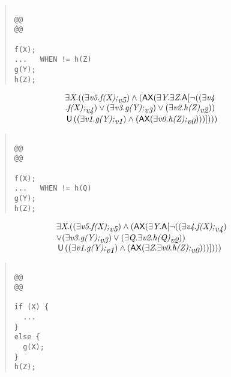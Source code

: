 \documentclass{article}
\newcommand{\U}{\,\mbox{\sf{U}}\,}
\newcommand{\A}{\mbox{\sf{A}}}
\newcommand{\AX}{\mbox{\sf{AX}}}
\newcommand{\mita}[1]{\mbox{\it{{#1}}}}
\begin{document}
\begin{quote}\begin{verbatim}

@@
@@

f(X);
...   WHEN != h(Z)
g(Y);
h(Z);
\end{verbatim}\end{quote}

\[\begin{array}{l}
\exists \mita{X} . ((\exists \mita{v5} . \mita{f(X);}_{\mita{v5}}) \wedge (\AX(\exists \mita{Y} . \exists \mita{Z} . \A[\neg ((\exists \mita{v4}\\ . \mita{f(X);}_{\mita{v4}}) \vee (\exists \mita{v3} . \mita{g(Y);}_{\mita{v3}}) \vee (\exists \mita{v2} . \mita{h(Z)}_{\mita{v2}}))\\ \U ((\exists \mita{v1} . \mita{g(Y);}_{\mita{v1}}) \wedge (\AX(\exists \mita{v0} . \mita{h(Z);}_{\mita{v0}})))]
)))
\end{array}\]

\begin{quote}\begin{verbatim}

@@
@@

f(X);
...   WHEN != h(Q)
g(Y);
h(Z);
\end{verbatim}\end{quote}

\[\begin{array}{l}
\exists \mita{X} . ((\exists \mita{v5} . \mita{f(X);}_{\mita{v5}}) \wedge (\AX(\exists \mita{Y} . \A[\neg ((\exists \mita{v4} . \mita{f(X);}_{\mita{v4}})\\ \vee (\exists \mita{v3} . \mita{g(Y);}_{\mita{v3}}) \vee (\exists \mita{Q} . \exists \mita{v2} . \mita{h(Q)}_{\mita{v2}}))\\ \U ((\exists \mita{v1} . \mita{g(Y);}_{\mita{v1}}) \wedge (\AX(\exists \mita{Z} . \exists \mita{v0} . \mita{h(Z);}_{\mita{v0}})))]
)))
\end{array}\]

\begin{quote}\begin{verbatim}

@@
@@

if (X) {
  ...
}
else {
  g(X);
}
h(Z);
\end{verbatim}\end{quote}
\end{document}
